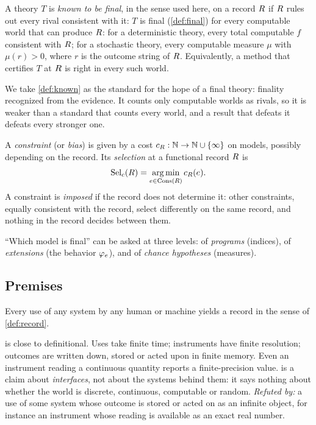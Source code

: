 \begin{definition}\label{def:known}
A theory $T$ is \emph{known to be final}, in the sense used here, on a record $R$ if
$R$ rules out every rival consistent with it: $T$ is final (\cref{def:final}) for every computable
world that can produce $R$: for a deterministic theory, every total computable $f$ consistent with
$R$; for a stochastic theory, every computable measure $\mu$ with $\mu(r)>0$, where
$r$ is the outcome string of $R$.
Equivalently, a method that certifies $T$ at $R$ is right in every such world.
\end{definition}

We take \cref{def:known} as the standard for the hope of a final theory: finality recognized
from the evidence. It counts only computable
worlds as rivals, so it is weaker than a standard that counts every world, and a result
that defeats it defeats every stronger one.

\begin{definition}\label{def:constraint}
A \emph{constraint} (or \emph{bias}) is given by a cost $c_R:\mathbb{N}\to\mathbb{N}\cup\{\infty\}$
on models, possibly depending on the record. Its \emph{selection} at a functional
record $R$ is
\[
  \operatorname{Sel}_c(R)=\operatorname*{arg\,min}_{e\in\operatorname{Cons}(R)} c_R(e).
\]
A constraint is \emph{imposed} if the record does not determine it: other constraints,
equally consistent with the record, select differently on the same record, and nothing
in the record decides between them.
\end{definition}

``Which model is final'' can be asked at three levels: of \emph{programs} (indices),
of \emph{extensions} (the behavior $\varphi_{e}$), and of \emph{chance hypotheses}
(measures).

\subsection{Premises}

\begin{premise}\label{prem:record}
Every use of any system by any human or machine yields a record in the sense of
\cref{def:record}.
\end{premise}

 is close to definitional. Uses take finite time; instruments have
finite resolution; outcomes are written down, stored or acted upon in finite memory.
Even an instrument reading a continuous quantity reports a finite-precision value.
 is a claim about \emph{interfaces}, not about the systems behind
them: it says nothing about whether the world is discrete, continuous, computable or
random.
\emph{Refuted by:} a use of some system whose outcome is stored or acted on as an
infinite object, for instance an instrument whose reading is available as an exact
real number.

